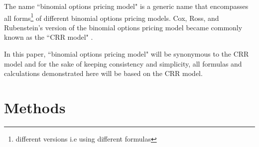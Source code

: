 \documentclass[12pt, letterpaper]{article}\usepackage{float}
\begin{document}
\medskip

The name ``binomial options pricing model" is a generic name that encompasses all forms\footnote{different versions i.e using different formulas} of different binomial options pricing models.
Cox, Ross, and Rubenstein's version of the binomial options pricing model became commonly known as the ``CRR model" \cite{thebinomialmodelcornell}.

\medskip

In this paper, ``binomial options pricing model" will be synonymous to the CRR model and for the sake of keeping consistency and simplicity, all formulas and calculations demonstrated here will be based on the CRR model.

\pagebreak

\section*{Methods}
\end{document}
